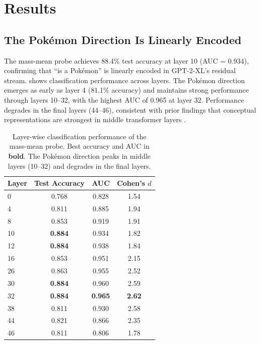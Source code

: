 \section{Results}
\label{sec:results}

\subsection{The Pok\'{e}mon Direction Is Linearly Encoded}
\label{sec:linear}

The mass-mean probe achieves 88.4\% test accuracy at layer 10 (AUC = 0.934), confirming that ``is a Pok\'{e}mon'' is linearly encoded in GPT-2-XL's residual stream.  shows classification performance across layers. The Pok\'{e}mon direction emerges as early as layer 4 (81.1\% accuracy) and maintains strong performance through layers 10--32, with the highest AUC of 0.965 at layer 32. Performance degrades in the final layers (44--46), consistent with prior findings that conceptual representations are strongest in middle transformer layers \citep{marks2024geometry, meng2022locating}.

\begin{table}[t]
    \centering
    \caption{Layer-wise classification performance of the mass-mean probe. Best accuracy and AUC in \textbf{bold}. The Pok\'{e}mon direction peaks in middle layers (10--32) and degrades in the final layers.}
    \label{tab:layer_accuracy}
    \begin{tabular}{@{}lccc@{}}
        \toprule
        Layer & Test Accuracy & AUC & Cohen's $d$ \\
        \midrule
        0  & 0.768 & 0.828 & 1.54 \\
        4  & 0.811 & 0.885 & 1.94 \\
        8  & 0.853 & 0.919 & 1.91 \\
        10 & {\bf 0.884} & 0.934 & 1.82 \\
        12 & {\bf 0.884} & 0.938 & 1.84 \\
        16 & 0.853 & 0.951 & 2.15 \\
        26 & 0.863 & 0.955 & 2.52 \\
        30 & {\bf 0.884} & 0.960 & 2.59 \\
        32 & {\bf 0.884} & {\bf 0.965} & {\bf 2.62} \\
        38 & 0.811 & 0.930 & 2.58 \\
        44 & 0.821 & 0.866 & 2.35 \\
        46 & 0.811 & 0.806 & 1.78 \\
        \bottomrule
    \end{tabular}
\end{table}

